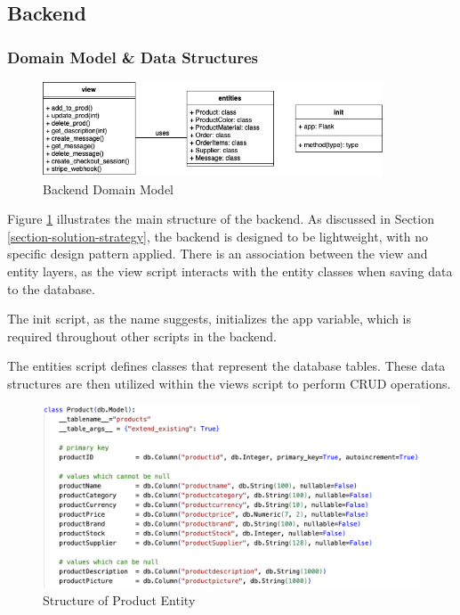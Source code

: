 \subsection{Backend}
\subsubsection{Domain Model \& Data Structures}

\begin{figure}[h]
    \centering
    \includegraphics[width=0.9\textwidth]{images/uml_backend.png}
    \caption{Backend Domain Model}
    \label{fig:doman-model-backend}
\end{figure}

Figure \ref{fig:doman-model-backend} illustrates the main structure of the backend. As discussed in Section \ref{section-solution-strategy}, the backend is designed to be lightweight, with no specific design pattern applied. There is an association between the view and entity layers, as the view script interacts with the entity classes when saving data to the database.

The init script, as the name suggests, initializes the app variable, which is required throughout other scripts in the backend.

The entities script defines classes that represent the database tables. These data structures are then utilized within the views script to perform CRUD operations.

\begin{figure}[h]
    \centering
    \includegraphics[width=\textwidth]{images/code_entity_example.png}
    \caption{Structure of Product Entity}
    \label{fig:db-entity}
\end{figure}

